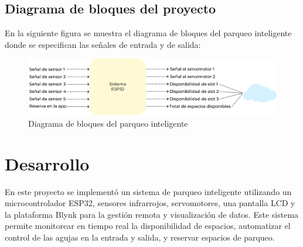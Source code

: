\documentclass[12pt,a4paper]{article}
\begin{document}
\subsection{Diagrama de bloques del proyecto}
En la siguiente figura se muestra el diagrama de bloques del parqueo inteligente donde se especifican las señales de entrada y de salida:

\begin{figure}[H]
    \centering
    \includegraphics[width=0.8\linewidth]{Imagenes/block.png}
    \caption{Diagrama de bloques del parqueo inteligente}
    \label{fig:7}
\end{figure}
\section{Desarrollo}
En este proyecto se implementó un sistema de parqueo inteligente utilizando un microcontrolador ESP32, sensores infrarrojos, servomotores, una pantalla LCD y la plataforma Blynk para la gestión remota y visualización de datos. Este sistema permite monitorear en tiempo real la disponibilidad de espacios, automatizar el control de las agujas en la entrada y salida, y reservar espacios de parqueo.
\end{document}
